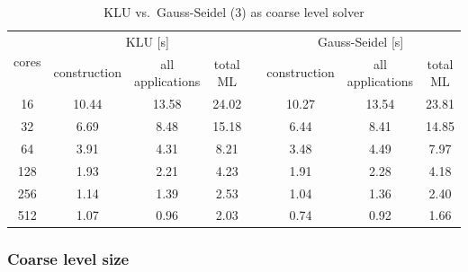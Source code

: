 \documentclass[a4paper,10pt,3p,preprint,pdftex]{elsarticle}
\begin{document}

\begin{table}[ht]
  \begin{center}
    \begin{tabular}{cccccccc}
      \hline
      \multirow{2}{*}{cores} & \multicolumn{3}{c}{KLU [s]} & &
      \multicolumn{3}{c}{Gauss-Seidel [s]} \\
      \cline{2-4} \cline{6-8}
      &  construction & all applications & total ML & & construction & all
      applications & total ML\\
      \hline
      16  & 10.44 & 13.58 & 24.02 & & 10.27 & 13.54 & 23.81 \\
      32  & 6.69 & 8.48 & 15.18 & & 6.44 & 8.41 & 14.85 \\
      64  & 3.91 & 4.31 & 8.21 & & 3.48 & 4.49 & 7.97 \\
      128 & 1.93 & 2.21 & 4.23 & & 1.91 & 2.28 & 4.18 \\
      256 & 1.14 & 1.39 & 2.53 & & 1.04 & 1.36 & 2.40 \\
      512 & 1.07 & 0.96 & 2.03 & & 0.74 & 0.92 & 1.66 \\
      \hline
    \end{tabular}
    \caption{KLU vs.\ Gauss-Seidel (3) as coarse level
    solver}\label{tab:gs_vs_klu} \end{center}
\end{table}

\subsubsection*{Coarse level size}
\end{document}
